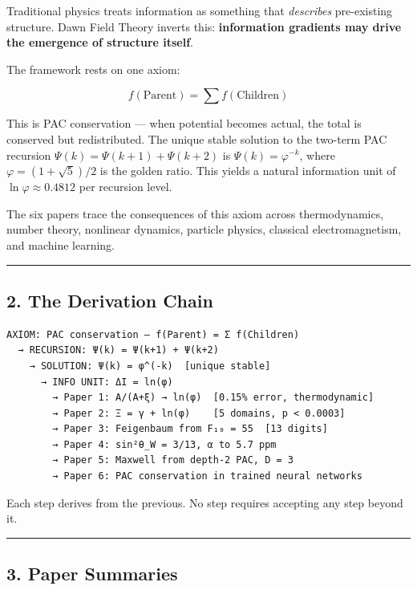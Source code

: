 \documentclass[
  11pt,
  a4paper]{article}
\begin{document}
Traditional physics treats information as something that
\emph{describes} pre-existing structure. Dawn Field Theory inverts this:
\textbf{information gradients may drive the emergence of structure
itself}.

The framework rests on one axiom:

\[f(\text{Parent}) = \sum f(\text{Children})\]

This is PAC conservation --- when potential becomes actual, the total is
conserved but redistributed. The unique stable solution to the two-term
PAC recursion \(\Psi(k) = \Psi(k{+}1) + \Psi(k{+}2)\) is
\(\Psi(k) = \varphi^{-k}\), where \(\varphi = (1{+}\sqrt{5})/2\) is the
golden ratio. This yields a natural information unit of
\(\ln\varphi \approx 0.4812\) per recursion level.

The six papers trace the consequences of this axiom across
thermodynamics, number theory, nonlinear dynamics, particle physics,
classical electromagnetism, and machine learning.

\begin{center}\rule{0.5\linewidth}{0.5pt}\end{center}

\subsection{2. The Derivation Chain}\label{the-derivation-chain}

\begin{verbatim}
AXIOM: PAC conservation — f(Parent) = Σ f(Children)
  → RECURSION: Ψ(k) = Ψ(k+1) + Ψ(k+2)
    → SOLUTION: Ψ(k) = φ^(-k)  [unique stable]
      → INFO UNIT: ΔI = ln(φ)
        → Paper 1: A/(A+ξ) → ln(φ)  [0.15% error, thermodynamic]
        → Paper 2: Ξ = γ + ln(φ)    [5 domains, p < 0.0003]
        → Paper 3: Feigenbaum from F₁₀ = 55  [13 digits]
        → Paper 4: sin²θ_W = 3/13, α to 5.7 ppm
        → Paper 5: Maxwell from depth-2 PAC, D = 3
        → Paper 6: PAC conservation in trained neural networks
\end{verbatim}

Each step derives from the previous. No step requires accepting any step
beyond it.

\begin{center}\rule{0.5\linewidth}{0.5pt}\end{center}

\subsection{3. Paper Summaries}\label{paper-summaries}
\end{document}
